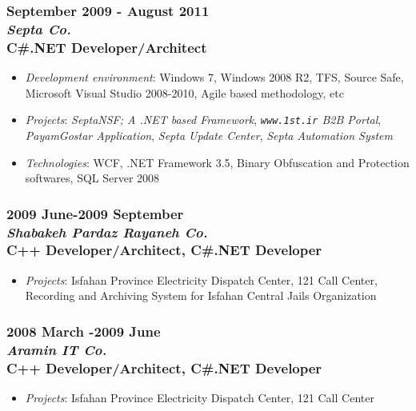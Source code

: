 \documentclass[10pt,a4paper]{article}
\begin{document}
\subsubsection{{September 2009 - August 2011} \\ \textnormal {\textit {Septa Co.}} \\ {C\#.NET Developer/Architect}}
  \setlength{\leftskip}{0.5cm}
  \setlength{\rightskip}{1cm}
  \begin{itemize}
    \setlength{\rightskip}{1cm}
    \setlength\itemsep{0em}
    \item \small \textit {Development environment}: Windows 7, Windows 2008 R2, TFS, Source Safe, Microsoft Visual Studio 2008-2010, Agile based methodology, etc
    \item \small \textit {Projects}: \textit{SeptaNSF; A .NET based Framework}, \textit{\texttt{www.1st.ir} B2B Portal}, \textit{PayamGostar Application}, \textit{Septa Update Center}, \textit{Septa Automation System}
    \item \small \textit {Technologies}: WCF, .NET Framework 3.5, Binary Obfuscation and Protection softwares, SQL Server 2008
  \end{itemize}
  \setlength{\leftskip}{0pt}
  \setlength{\rightskip}{0cm}

\subsubsection{{2009 June-2009 September} \\ \textnormal {\textit {Shabakeh Pardaz Rayaneh Co.}} \\ {C++ Developer/Architect, C\#.NET Developer}}
  \setlength{\leftskip}{0.5cm}
  \setlength{\rightskip}{1cm}
	\begin{itemize}
	  \setlength{\rightskip}{1cm}
    \setlength\itemsep{0em}
    \item \small \textit{Projects}: Isfahan Province Electricity Dispatch Center, 121 Call Center, Recording and Archiving System for Isfahan Central Jails Organization
	\end{itemize}
	\setlength{\leftskip}{0pt}
  \setlength{\rightskip}{0cm}
		
\subsubsection{{2008 March -2009 June} \\ \textnormal {\textit {Aramin IT Co.}} \\ {C++ Developer/Architect, C\#.NET Developer}}
  \setlength{\leftskip}{0.5cm}
  \setlength{\rightskip}{1cm}
  \begin{itemize}
    \setlength{\rightskip}{1cm}
    \setlength\itemsep{0em}
    \item \small \textit{Projects}: Isfahan Province Electricity Dispatch Center, 121 Call Center
	\end{itemize}
  \setlength{\leftskip}{0pt}
  \setlength{\rightskip}{0cm}
\end{document}

